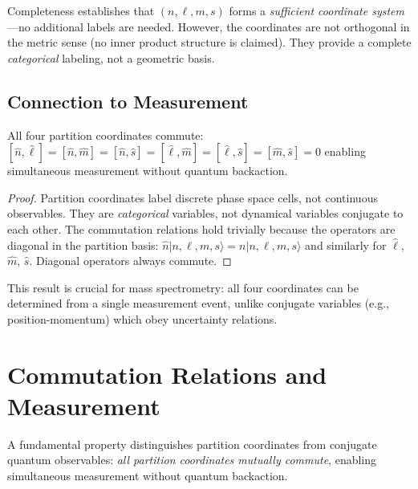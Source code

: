 \begin{remark}
Completeness establishes that $(n, \ell, m, s)$ forms a \emph{sufficient coordinate system}---no additional labels are needed. However, the coordinates are not orthogonal in the metric sense (no inner product structure is claimed). They provide a complete \emph{categorical} labeling, not a geometric basis.
\end{remark}



\subsection{Connection to Measurement}

\begin{proposition}
\label{prop:commutation}
All four partition coordinates commute:
$
[\hat{n}, \hat{\ell}] = [\hat{n}, \hat{m}] = [\hat{n}, \hat{s}] = [\hat{\ell}, \hat{m}] = [\hat{\ell}, \hat{s}] = [\hat{m}, \hat{s}] = 0
$
enabling simultaneous measurement without quantum backaction.
\end{proposition}

\begin{proof}
Partition coordinates label discrete phase space cells, not continuous observables. They are \emph{categorical} variables, not dynamical variables conjugate to each other. The commutation relations hold trivially because the operators are diagonal in the partition basis:
$
\hat{n}|n, \ell, m, s\rangle = n|n, \ell, m, s\rangle
$
and similarly for $\hat{\ell}$, $\hat{m}$, $\hat{s}$. Diagonal operators always commute.
\end{proof}

This result is crucial for mass spectrometry: all four coordinates can be determined from a single measurement event, unlike conjugate variables (e.g., position-momentum) which obey uncertainty relations.

\section{Commutation Relations and Measurement}
\label{sec:commutation}

A fundamental property distinguishes partition coordinates from conjugate quantum observables: \emph{all partition coordinates mutually commute}, enabling simultaneous measurement without quantum backaction.

